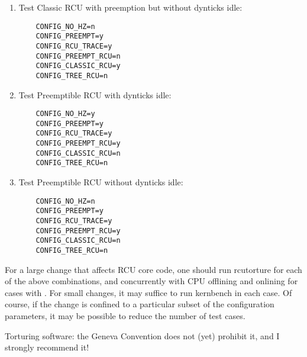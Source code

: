 \begin{enumerate}
\item	Test Classic RCU with preemption but without dynticks idle:

\vspace{5pt}
\begin{minipage}[t]{\columnwidth}
\scriptsize
\begin{verbatim}
	CONFIG_NO_HZ=n
	CONFIG_PREEMPT=y
	CONFIG_RCU_TRACE=y
	CONFIG_PREEMPT_RCU=n
	CONFIG_CLASSIC_RCU=y
	CONFIG_TREE_RCU=n
\end{verbatim}
\end{minipage}
\vspace{5pt}

\item	Test Preemptible RCU with dynticks idle:

\vspace{5pt}
\begin{minipage}[t]{\columnwidth}
\scriptsize
\begin{verbatim}
	CONFIG_NO_HZ=y
	CONFIG_PREEMPT=y
	CONFIG_RCU_TRACE=y
	CONFIG_PREEMPT_RCU=y
	CONFIG_CLASSIC_RCU=n
	CONFIG_TREE_RCU=n
\end{verbatim}
\end{minipage}
\vspace{5pt}
\item	Test Preemptible RCU without dynticks idle:

\vspace{5pt}

\begin{minipage}[t]{\columnwidth}
\scriptsize
\begin{verbatim}
	CONFIG_NO_HZ=n
	CONFIG_PREEMPT=y
	CONFIG_RCU_TRACE=y
	CONFIG_PREEMPT_RCU=y
	CONFIG_CLASSIC_RCU=n
	CONFIG_TREE_RCU=n
\end{verbatim}
\end{minipage}
\vspace{5pt}
\end{enumerate}

For a large change that affects RCU core code, one should run
rcutorture for each of the above combinations, and concurrently
with CPU offlining and onlining for cases with
.
For small changes, it may suffice to run kernbench in each case.
Of course, if the change is confined to a particular subset of
the configuration parameters, it may be possible to reduce the
number of test cases.

Torturing software: the Geneva Convention does not (yet) prohibit
it, and I strongly recommend it!

